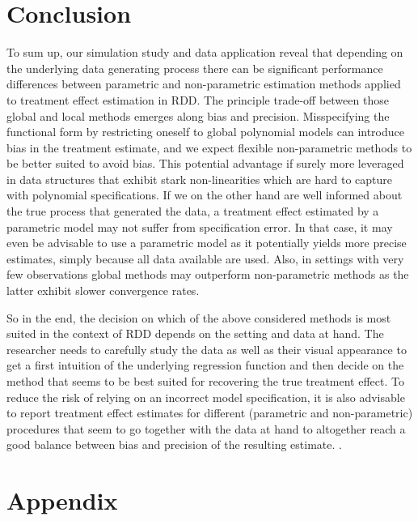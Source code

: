 \documentclass[11pt, a4paper, leqno]{article}
\numberwithin{equation}{section}
\numberwithin{figure}{section}
\numberwithin{table}{section}
\numberwithin{algorithm}{section}
\begin{document}
\section{Conclusion} %
\label{sec: conclusion}
To sum up, our simulation study and data application reveal that depending on the underlying data generating process there can be significant performance differences between parametric and non-parametric estimation methods applied to treatment effect estimation in RDD. The principle trade-off between those global and local methods emerges along bias and precision. Misspecifying the functional form by restricting oneself to global polynomial models can introduce bias in the treatment estimate, and we expect flexible non-parametric methods to be better suited to avoid bias. This potential advantage if surely more leveraged in data structures that exhibit stark non-linearities which are hard to capture with polynomial specifications. If we on the other hand are well informed about the true process that generated the data, a treatment effect estimated by a parametric model may not suffer from specification error. In that case, it may even be advisable to use a parametric model as it potentially yields more precise estimates, simply because all data available are used. Also, in settings with very few observations global methods may outperform non-parametric methods as the latter exhibit slower convergence rates.

So in the end, the decision on which of the above considered methods is most suited in the context of RDD depends on the setting and data at hand. The researcher needs to carefully study the data as well as their visual appearance to get a first intuition of the underlying regression function and then decide on the method that seems to be best suited for recovering the true treatment effect. To reduce the risk of relying on an incorrect model specification, it is also advisable to report treatment effect estimates for different (parametric and non-parametric) procedures that seem to go together with the data at hand to altogether reach a good balance between bias and precision of the resulting estimate.
.



\clearpage

\clearpage

\setcounter{section}{1}
\renewcommand\thesubsection{\Alph{subsection}}
\renewcommand\thetable{\Alph{section}.\arabic{table}}

\section*{\LARGE Appendix}
\end{document}
